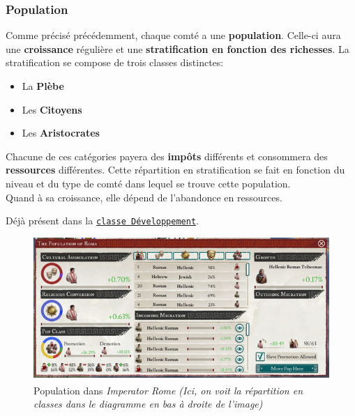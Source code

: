 \documentclass{article}
\newcommand{\ulcolor}[2][class]{\setulcolor{#1}\ul{#2}}
\newcommand{\ulcolor}[2][var]{\setulcolor{#1}\ul{#2}}
\newcommand{\ulcolor}[2][func]{\setulcolor{#1}\ul{#2}}
\newcommand*{\mybox}[2]{\colorbox{#1!30}{\parbox{.98\linewidth}{#2}}}
\newcommand\tab[1][0.5cm]{\hspace*{#1}}
\newcommand{\genbox}[1]{\mybox{verylightgray}{#1}}
\newcommand{\class}[1]{\texttt{\textcolor{codeColour}{\ulcolor[class]{#1}}}}
\def\reg{\small{\textsuperscript{\textregistered}}}
\begin{document}
            \subsubsection{Population} 
                Comme précisé précédemment, chaque comté a une \textbf{population}. Celle-ci aura une \textbf{croissance} régulière et une \textbf{stratification en fonction des richesses}. La stratification se compose de trois classes distinctes:
                    \begin{itemize}
                        \item La \textbf{Plèbe}
                        \item Les \textbf{Citoyens}
                        \item Les \textbf{Aristocrates}
                    \end{itemize}
                Chacune de ces catégories payera des \textbf{impôts} différents et consommera des \textbf{ressources} différentes. Cette répartition en stratification se fait en fonction du niveau et du type de comté dans lequel se trouve cette population. \\
                Quand à sa croissance, elle dépend de l'abandonce en ressources.

                \tab \genbox{
                    Déjà présent dans la \class{classe D\'eveloppement}. \\
                }

                \begin{figure}[h]
                    \centering
                        \includegraphics[scale=1.7]{image_ir_population.png}
                        \caption{Population dans \textit{Imperator Rome\reg} \textit{(Ici, on voit la répartition en classes dans le diagramme en bas à droite de l'image)}}
                        \label{fig:x photosysteme}
                \end{figure}
\end{document}
